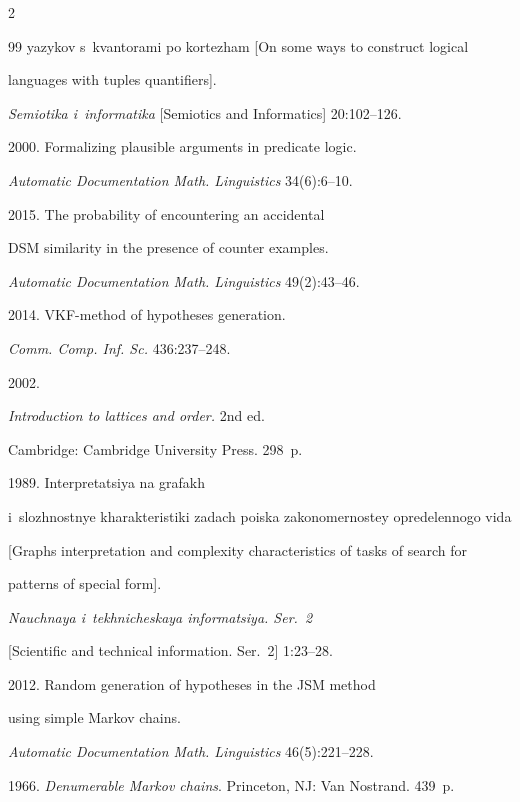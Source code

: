 \begin{multicols}{2}
{{\begin{thebibliography}{99}
yazykov s~kvantorami po kor\-te\-zham [On some ways to construct logical 

languages with tuples quantifiers]. 

\textit{Semiotika i~informatika} [Semiotics and Informatics] 20:102--126.


 2000. Formalizing plausible arguments in predicate logic. 

\textit{Automatic Documentation Math. Linguistics} 34(6):6--10.


 2015. The probability of encountering an accidental 

DSM similarity in the presence of counter examples. 

\textit{Automatic Documentation Math. Linguistics} 49(2):43--46.


 2014. VKF-method of hypotheses generation. 

\textit{Comm. Comp. Inf. Sc.} 436:237--248.


 2002. 

\textit{Introduction to lattices and order.} 2nd ed. 

Cambridge: Cambridge University Press. 298~p.


 1989. Interpretatsiya na grafakh 

i~slozhnostnye kharakteristiki zadach poiska zakonomernostey opredelennogo vida 

[Graphs interpretation and complexity characteristics of tasks of search for 

patterns of special form]. 

\textit{Nauchnaya i~tekhnicheskaya informatsiya. Ser.~2} 

[Scientific and technical information. Ser.~2]  1:23--28. 


 2012. Random generation of hypotheses in the JSM method 

using simple Markov chains. 

\textit{Automatic Documentation Math. Linguistics} 46(5):221--228.



 1966. \textit{Denumerable Markov chains}. Princeton, NJ: Van Nostrand. 439~p.



\end{thebibliography}



 }

 }



\end{multicols}




